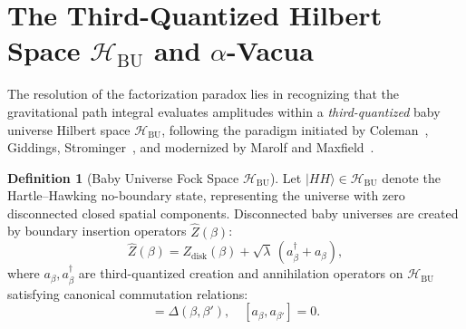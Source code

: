 \documentclass[11pt,a4paper,reqno]{article}
\theoremstyle{plain}
\theoremstyle{definition}
\newtheorem{definition}[theorem]{Definition}
\theoremstyle{remark}
\numberwithin{equation}{section}
\newcommand{\Hbu}{\mathcal{H}_{\mathrm{BU}}}
\newcommand{\HH}{|HH\rangle}
\newcommand{\Zop}{\widehat{Z}}
\begin{document}
\section{The Third-Quantized Hilbert Space \texorpdfstring{$\mathcal{H}_{\mathrm{BU}}$}{H BU} and \texorpdfstring{$\alpha$}{alpha}-Vacua}
\label{sec:alpha_vacua}

The resolution of the factorization paradox lies in recognizing that the gravitational path integral evaluates amplitudes within a \emph{third-quantized} baby universe Hilbert space $\Hbu$, following the paradigm initiated by Coleman~\cite{Coleman1988}, Giddings, Strominger~\cite{GiddingsStrominger1988}, and modernized by Marolf and Maxfield~\cite{MarolfMaxfield2020}.

\begin{definition}[Baby Universe Fock Space $\Hbu$]
Let $\HH \in \Hbu$ denote the Hartle--Hawking no-boundary state, representing the universe with zero disconnected closed spatial components. Disconnected baby universes are created by boundary insertion operators $\Zop(\beta)$:
\begin{equation}
  \Zop(\beta) = Z_{\mathrm{disk}}(\beta) + \sqrt{\lambda} \, (a_\beta^\dagger + a_\beta),
  \label{eq:boundary_creation_operator}
\end{equation}
where $a_\beta, a_\beta^\dagger$ are third-quantized creation and annihilation operators on $\Hbu$ satisfying canonical commutation relations:
\begin{equation}
  [a_\beta, a_{\beta'}^\dagger] = \Delta(\beta, \beta'), \quad [a_\beta, a_{\beta'}] = 0.
\end{equation}
\end{definition}
\end{document}
